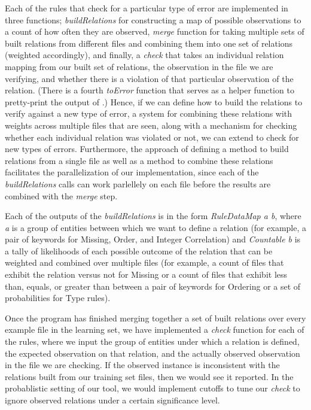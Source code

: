 Each of the rules that check for a particular type of error are implemented in three functions;
   \textit{buildRelations} for constructing a map of possible observations to a count of how often they are observed, 
   \textit{merge} function for taking multiple sets of built relations from different files and combining them into one set of relations (weighted accordingly), 
   and finally, a \textit{check} that takes an individual relation mapping from our built set of relations, the observation in the file we are verifying, and whether there is a violation of that particular observation of the relation. 
(There is a fourth \textit{toError} function that serves as a helper function to pretty-print the output of \app.) 
Hence, if we can define how to build the relations to verify against a new type of error, a system for combining these relations with weights across multiple files that are seen, along with a mechanism for checking whether each individual relation was violated or not, we can extend \app to check for new types of errors. Furthermore, the approach of defining a method to build relations from a single file as well as a method to combine these relations facilitates the parallelization of our implementation, since each of the \textit{buildRelations} calls can work parlellely on each file before the results are combined with the \textit{merge} step.

Each of the outputs of the \textit{buildRelations} is in the form \textit{RuleDataMap a b}, where \textit{a} is a group of entities between which we want to define a relation (for example, a pair of keywords for Missing, Order, and Integer Correlation) and \textit{Countable b} is a tally of likelihoods of each possible outcome of the relation that can be weighted and combined over multiple files (for example, a count of files that exhibit the relation versus not for Missing or a count of files that exhibit less than, equals, or greater than between a pair of keywords for Ordering or a set of probabilities for Type rules).

Once the program has finished merging together a set of built relations over every example file in the learning set, we have implemented a \textit{check} function for each of the rules, where we input the group of entities under which a relation is defined, the expected observation on that relation, and the actually observed observation in the file we are checking. If the observed instance is inconsistent with the relations built from our training set files, then we would see it reported. In the probablistic setting of our tool, we would implement cutoffs to tune our \textit{check} to ignore observed relations under a certain significance level.
\fi

